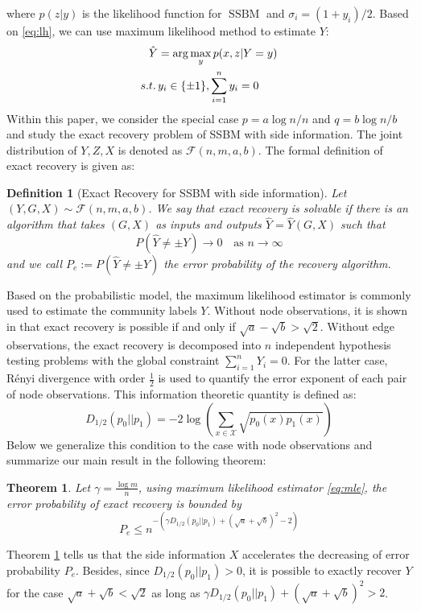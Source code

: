 \documentclass[conference]{IEEEtran}
\newtheorem{definition}{Definition}
\newtheorem{theorem}{Theorem}
\DeclareMathOperator{\SSBM}{SSBM}
\begin{document}
where $p(z|y)$ is the likelihood function for $\SSBM$ and $\sigma_i = (1+y_i)/2$.
Based on \eqref{eq:lh}, we can use maximum likelihood method to estimate
$Y$:
\begin{align}
    \hat{Y} &= \arg\max_y p(x,z|Y=y) \notag \\
    s.t.\, & y_i \in \{\pm 1\}, \sum_{i=1}^n y_i=0 \label{eq:mle}
\end{align}
Within this paper, we consider the special case $p = a \log n /n$ and $q = b \log n / b$ and study
the exact recovery problem of SSBM with side information. The joint distribution
of $Y,Z, X$ is denoted as $\mathcal{F}(n,m,a,b)$.
The formal definition of exact
recovery is given as:
\begin{definition}[Exact Recovery for SSBM with side information]
		Let $(Y,G,X) \sim \mathcal{F}(n,m,a,b)$.
		We say that exact recovery is solvable if there is an algorithm that takes $(G,X)$ as inputs and outputs $\hat{Y}=\hat{Y}(G,X)$ such that
		$$
		P(\hat{Y} \neq \pm Y) \to 0
		\text{~~~as~} n\to\infty
		$$
		and we call $P_e:=P(\hat{Y} \neq \pm Y)$ the error probability of the recovery algorithm.
\end{definition}
Based on the probabilistic model, the maximum likelihood estimator
is commonly used to estimate the community labels $Y$.
Without node observations, it is shown in \cite{abbe2015exact}
that exact recovery is possible if and only if $\sqrt{a} - \sqrt{b} > \sqrt{2}$.
Without edge observations, the exact recovery is decomposed into $n$
independent hypothesis testing problems with the global constraint $\sum_{i=1}^n Y_i=0$. For the latter case, Rényi divergence with order $\frac{1}{2}$
is used to quantify the error exponent of each pair of node observations.
This information theoretic quantity is defined as:
\begin{equation}
    D_{1/2}(p_0 || p_1) = -2\log(\sum_{x \in \mathcal{X}} \sqrt{p_0(x)p_1(x)} )
\end{equation}
Below we generalize this condition to the case with node observations and summarize
our main result in the following theorem:
\begin{theorem}\label{thm:Pe}
Let $\gamma = \frac{\log m}{n}$, using maximum likelihood estimator \eqref{eq:mle}, the error probability
of exact recovery is bounded by
\begin{equation}
    P_e \leq n^{-\left(\gamma D_{1/2}(p_0||p_1) + (\sqrt{a} + \sqrt{b})^2-2\right)}
\end{equation}
\end{theorem}
Theorem \ref{thm:Pe} tells us that the side information $X$ accelerates the
decreasing of error probability $P_e$. Besides, since 
$D_{1/2}(p_0||p_1) > 0$, it is possible to exactly recover $Y$
for the case $\sqrt{a} + \sqrt{b} < \sqrt{2}$ as long as $\gamma D_{1/2}(p_0||p_1) + (\sqrt{a} + \sqrt{b})^2 > 2$.
\end{document}
